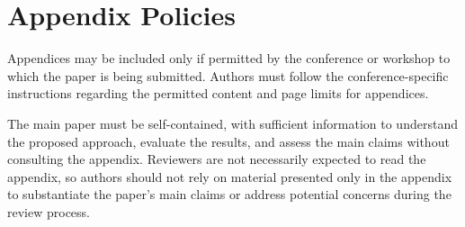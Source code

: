 \documentclass[9pt]{ieeeconf}
\begin{document}











\appendix

\section{Appendix Policies}
\label{sec:appendix_policies}

Appendices may be included only if permitted by the conference
or workshop to which the paper is being submitted. Authors must
follow the conference-specific instructions regarding the
permitted content and page limits for appendices.

The main paper must be self-contained, with sufficient information
to understand the proposed approach, evaluate the results, and
assess the main claims without consulting the appendix. Reviewers
are not necessarily expected to read the appendix, so authors
should not rely on material presented only in the appendix to
substantiate the paper's main claims or address potential concerns
during the review process.
\end{document}
